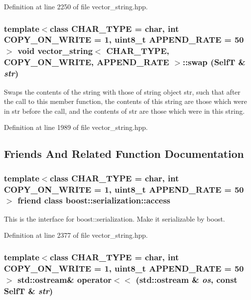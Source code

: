 Definition at line 2250 of file vector\_\-string.hpp.\hypertarget{classvector__string_a18b53a78ca97187d7145d9c004f5d54}{
\subsubsection[{swap}]{\setlength{\rightskip}{0pt plus 5cm}template$<$class CHAR\_\-TYPE  = char, int COPY\_\-ON\_\-WRITE = 1, uint8\_\-t APPEND\_\-RATE = 50$>$ void {\bf vector\_\-string}$<$ CHAR\_\-TYPE, COPY\_\-ON\_\-WRITE, APPEND\_\-RATE $>$::swap ({\bf SelfT} \& {\em str})}}
\label{classvector__string_a18b53a78ca97187d7145d9c004f5d54}


Swaps the contents of the string with those of string object str, such that after the call to this member function, the contents of this string are those which were in str before the call, and the contents of str are those which were in this string. 

Definition at line 1989 of file vector\_\-string.hpp.

\subsection{Friends And Related Function Documentation}
\hypertarget{classvector__string_c98d07dd8f7b70e16ccb9a01abf56b9c}{
\subsubsection[{boost::serialization::access}]{\setlength{\rightskip}{0pt plus 5cm}template$<$class CHAR\_\-TYPE  = char, int COPY\_\-ON\_\-WRITE = 1, uint8\_\-t APPEND\_\-RATE = 50$>$ friend class boost::serialization::access}}
\label{classvector__string_c98d07dd8f7b70e16ccb9a01abf56b9c}


This is the interface for boost::serialization. Make it serializable by boost. 

Definition at line 2377 of file vector\_\-string.hpp.\hypertarget{classvector__string_9f77d965eac7a717e9124196d686e094}{
\subsubsection[{operator$<$$<$}]{\setlength{\rightskip}{0pt plus 5cm}template$<$class CHAR\_\-TYPE  = char, int COPY\_\-ON\_\-WRITE = 1, uint8\_\-t APPEND\_\-RATE = 50$>$ std::ostream\& operator$<$$<$ (std::ostream \& {\em os}, \/  const {\bf SelfT} \& {\em str})}}
\label{classvector__string_9f77d965eac7a717e9124196d686e094}


